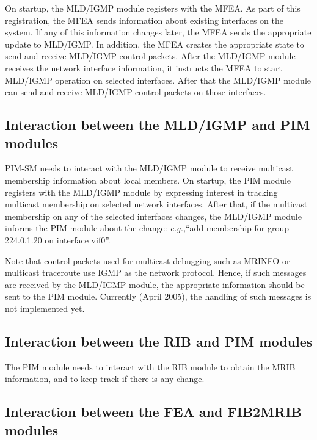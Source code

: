 \documentclass[11pt]{article}
\newcommand{\eg}{\emph{e.g.,}\xspace}
\begin{document}
On startup, the MLD/IGMP module registers with the MFEA. As part of this
registration, the MFEA sends information about existing
interfaces on the system. If
any of this information changes later, the MFEA sends the appropriate update
to MLD/IGMP. In addition, the MFEA creates the appropriate state to send and
receive MLD/IGMP control packets. After the MLD/IGMP module receives the
network interface information, it instructs the MFEA to start MLD/IGMP
operation on selected interfaces. After that the MLD/IGMP module can send and
receive MLD/IGMP control packets on those interfaces.

\subsection{Interaction between the MLD/IGMP and PIM modules}

PIM-SM needs to interact with the MLD/IGMP module to receive multicast
membership information about local members. On startup, the PIM module
registers with the MLD/IGMP module by expressing interest in tracking
multicast membership on selected network interfaces. After that, if
the multicast membership on any of the selected interfaces changes, the
MLD/IGMP module informs the PIM module about the change: \eg ``add
membership for group 224.0.1.20 on interface vif0''.

Note that control packets used for multicast debugging such as MRINFO or
multicast traceroute use IGMP as the network protocol. Hence, if such
messages are received by the MLD/IGMP module, the appropriate
information should be sent to the PIM module. Currently (April 2005),
the handling of such messages is not implemented yet.

\subsection{Interaction between the RIB and PIM modules}

The PIM module needs to interact with the RIB module to obtain the MRIB
information, and to keep track if there is any change.

\subsection{Interaction between the FEA and FIB2MRIB modules}
\label{sec:fea-to-fib2mrib-interaction}
\end{document}
